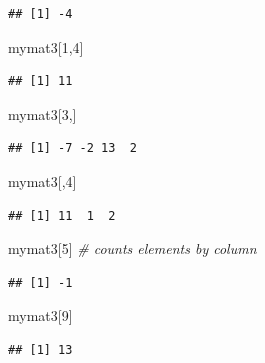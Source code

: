 \documentclass[]{book}
\newenvironment{Shaded}{\begin{snugshade}}{\end{snugshade}}
\newcommand{\DecValTok}[1]{\textcolor[rgb]{0.00,0.00,0.81}{{#1}}}
\newcommand{\CommentTok}[1]{\textcolor[rgb]{0.56,0.35,0.01}{\textit{{#1}}}}
\newcommand{\NormalTok}[1]{{#1}}
\begin{document}
\begin{verbatim}
## [1] -4
\end{verbatim}

\begin{Shaded}
\begin{Highlighting}[]
\NormalTok{mymat3[}\DecValTok{1}\NormalTok{,}\DecValTok{4}\NormalTok{]}
\end{Highlighting}
\end{Shaded}

\begin{verbatim}
## [1] 11
\end{verbatim}

\begin{Shaded}
\begin{Highlighting}[]
\NormalTok{mymat3[}\DecValTok{3}\NormalTok{,]}
\end{Highlighting}
\end{Shaded}

\begin{verbatim}
## [1] -7 -2 13  2
\end{verbatim}

\begin{Shaded}
\begin{Highlighting}[]
\NormalTok{mymat3[,}\DecValTok{4}\NormalTok{]}
\end{Highlighting}
\end{Shaded}

\begin{verbatim}
## [1] 11  1  2
\end{verbatim}

\begin{Shaded}
\begin{Highlighting}[]
\NormalTok{mymat3[}\DecValTok{5}\NormalTok{] }\CommentTok{# counts elements by column}
\end{Highlighting}
\end{Shaded}

\begin{verbatim}
## [1] -1
\end{verbatim}

\begin{Shaded}
\begin{Highlighting}[]
\NormalTok{mymat3[}\DecValTok{9}\NormalTok{]}
\end{Highlighting}
\end{Shaded}

\begin{verbatim}
## [1] 13
\end{verbatim}
\end{document}
